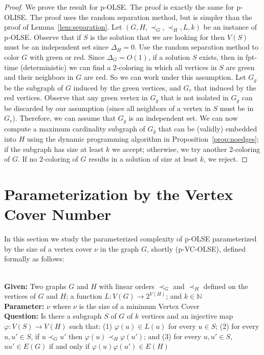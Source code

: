 \documentclass[11pt]{article}
\newcommand{\paramproblem}[4]{\noindent {\sc #1}
\\
{\bf Given:} #2\\
{\bf Parameter:} #3\\
{\bf Question:} #4}
\newcommand{\nat}{\mathbb{N}}
\let\phi=\varphi
\begin{document}
\begin{proof}
We prove the result for p-OLSE. The proof is exactly the same for p-OLISE. The proof uses the random separation method, but is simpler than the proof of Lemma~\ref{lem:separation}. Let $(G, H, \prec_G, \prec_H, L, k)$ be an instance of p-OLSE. Observe that if $S$ is the solution that we are looking for then $V(S)$ must be an independent set since $\Delta_H=0$. Use the random separation method to color $G$ with green or red. Since $\Delta_G = O(1)$, if a solution $S$ exists, then in fpt-time (deterministic) we can find a 2-coloring in which all vertices in $S$ are green and their neighbors in $G$ are red. So we can work under this assumption. Let $G_g$ be the subgraph of $G$ induced by the green vertices, and $G_r$ that induced by the red vertices. Observe that any green vertex in $G_g$ that is not isolated in $G_g$ can be discarded by our assumption (since all neighbors of a vertex in $S$ must be in $G_r$). Therefore, we can assume that $G_g$ is an independent set. We can now compute a maximum cardinality subgraph of $G_g$ that can be (validly) embedded into $H$ using the dynamic programming algorithm in Proposition~\ref{prop:noedges}; if the subgraph has size at least $k$ we accept; otherwise, we try another 2-coloring of $G$. If no 2-coloring of $G$ results in a solution of size at least $k$, we reject.\end{proof}



\section{Parameterization by the Vertex Cover Number}
\label{sec:vcnumber}
In this section we study the parameterized complexity of p-OLSE parameterized by the size of a vertex cover $\nu$ in the graph $G$, shortly (p-VC-OLSE), defined formally as follows:

\paramproblem{} {Two graphs $G$ and $H$ with linear orders $\prec_G$ and $\prec_{H}$ defined on the vertices of $G$ and $H$; a function $L : V(G) \longrightarrow 2^{V(H)}$; and $k \in \nat$}{$\nu$ where $\nu$ is the size of a minimum Vertex Cover}{Is there a subgraph $S$ of $G$ of $k$ vertices and an injective map $\phi: V(S) \longrightarrow V(H)$ such that: (1) $\phi(u) \in L(u)$ for every $u \in S$; (2) for every $u, u' \in S$, if $u \prec_G u'$ then $\phi(u) \prec_H \phi(u')$; and (3) for every $u, u' \in S$, $uu' \in E(G)$ if and only if $\phi(u)\phi(u') \in E(H)$} \\
\end{document}
